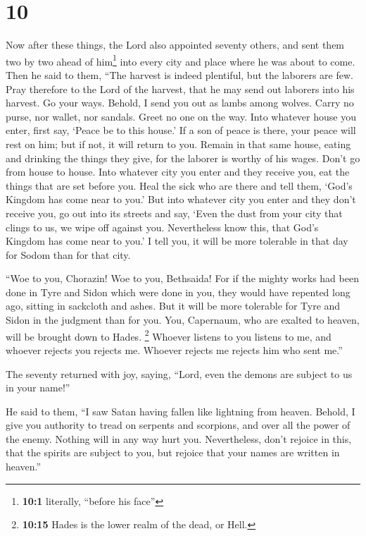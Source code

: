 \hypertarget{section-9}{%
\section{10}\label{section-9}}

 Now after these things, the Lord also appointed seventy
others, and sent them two by two ahead of him\footnote{\textbf{10:1}
  literally, ``before his face''} into every city and place where he was
about to come.  Then he said to them, ``The harvest is
indeed plentiful, but the laborers are few. Pray therefore to the Lord
of the harvest, that he may send out laborers into his harvest.
 Go your ways. Behold, I send you out as lambs among
wolves.  Carry no purse, nor wallet, nor sandals. Greet no
one on the way.  Into whatever house you enter, first say,
`Peace be to this house.'  If a son of peace is there,
your peace will rest on him; but if not, it will return to you.
 Remain in that same house, eating and drinking the things
they give, for the laborer is worthy of his wages. Don't go from house
to house.  Into whatever city you enter and they receive
you, eat the things that are set before you.  Heal the
sick who are there and tell them, `God's Kingdom has come near to you.'
 But into whatever city you enter and they don't receive
you, go out into its streets and say,  `Even the dust
from your city that clings to us, we wipe off against you. Nevertheless
know this, that God's Kingdom has come near to you.'  I
tell you, it will be more tolerable in that day for Sodom than for that
city.

 ``Woe to you, Chorazin! Woe to you, Bethsaida! For if
the mighty works had been done in Tyre and Sidon which were done in you,
they would have repented long ago, sitting in sackcloth and ashes.
 But it will be more tolerable for Tyre and Sidon in the
judgment than for you.  You, Capernaum, who are exalted
to heaven, will be brought down to Hades. \footnote{\textbf{10:15} Hades
  is the lower realm of the dead, or Hell.}  Whoever
listens to you listens to me, and whoever rejects you rejects me.
Whoever rejects me rejects him who sent me.''

 The seventy returned with joy, saying, ``Lord, even the
demons are subject to us in your name!''

 He said to them, ``I saw Satan having fallen like
lightning from heaven.  Behold, I give you authority to
tread on serpents and scorpions, and over all the power of the enemy.
Nothing will in any way hurt you.  Nevertheless, don't
rejoice in this, that the spirits are subject to you, but rejoice that
your names are written in heaven.''

